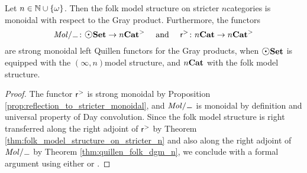 \begin{prop} \label{prop:Gray_monoidal}
    Let \( n \in \mathbb{N} \cup \left\{ {\omega} \right\} \).
    Then the folk model structure on stricter \( n \)\nbd categories is monoidal with respect to the Gray product.
    Furthermore, the functors 
    \begin{equation*}
         \molecin{-} \colon \dgmSet \to \snCat{n} \quad\text{ and }\quad \rcs \colon \nCat{n} \to \snCat{n}
    \end{equation*}
    are strong monoidal left Quillen functors for the Gray products, when \( \dgmSet \) is equipped with the \( (\infty, n) \)\nbd model structure, and \( {n\mathbf{Cat}} \) with the folk model structure.
\end{prop}
\begin{proof}
    The functor \( \mathsf{r}^{>} \) is strong monoidal by Proposition \ref{prop:reflection_to_stricter_monoidal}, and \( \molecin{-} \) is monoidal by definition and universal property of Day convolution.
    Since the folk model structure is right transferred along the right adjoint of \( \mathsf{r}^{>} \) by Theorem \ref{thm:folk_model_structure_on_stricter_n} and also along the right adjoint of \( \molecin{-} \) by Theorem \ref{thm:quillen_folk_dgm_n}, we conclude with a formal argument using either \cite[Theorem 5.6]{ara2020monoidal} or \cite[Theorem 5.10]{chanavat2025gray}.
\end{proof}